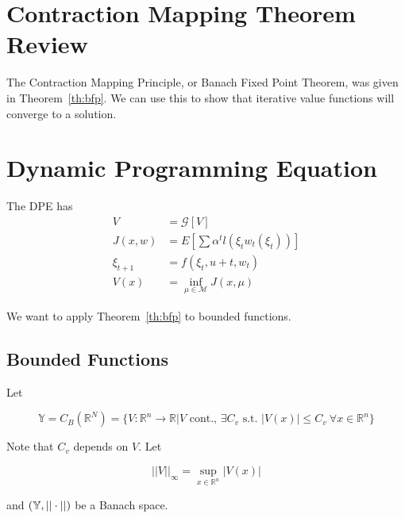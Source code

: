 \mainmatter%
\setcounter{page}{1}

\lectureseries[\course]{\course}

\date{October 22, 2009}

\setaddress%

\setcounter{lecture}{7}
\setcounter{chapter}{7}


\section{Contraction Mapping Theorem Review}
The Contraction Mapping Principle, or Banach Fixed Point Theorem, was given in Theorem~\ref{th:bfp}.
We can use this to show that iterative value functions will converge to a solution.

\section{Dynamic Programming Equation}
The DPE has
\begin{align*}
V&=\mathcal{G}[V] \\
J(x,w) &= E[\sum\alpha^t l(\xi_t w_t(\xi_t))] \\
\xi_{t+1} &= f(\xi_t,u+t,w_t) \\
V(x) &= \inf_{\mu\in\mathcal{M}}J(x,\mu)
\end{align*}

We want to apply Theorem~\ref{th:bfp} to bounded functions.

\subsection{Bounded Functions}
Let

\begin{equation*}
\mathbb{Y} = C_B(\mathbb{R}^N) = \{V:\mathbb{R}^n\to\mathbb{R} | V \text{~cont.,~} \exists C_v \text{~s.t.~} |V(x)|\leq C_v~\forall x\in\mathbb{R}^n\}
\end{equation*}

Note that $C_v$ depends on $V$.
Let

\begin{equation*}
||V||_\infty = \sup_{x\in\mathbb{R}^n}|V(x)|
\end{equation*}

and $(\mathbb{Y},||\cdot||)$ be a Banach space.


